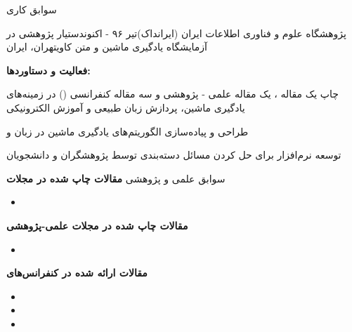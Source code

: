 \documentclass{resume} %
\begin{document}
%

\begin{rSection}{سوابق‌ کاری}
\def\jobtitle{دستیار پژوهشی در آزمایشگاه یادگیری ماشین و متن کاوی}
\def\employername{پژوهشگاه علوم و فناوری اطلاعات ایران (ایرانداک)}
\def\years{تیر ۹۶ - اکنون}
\def\location{تهران، ایران}

\begin{rSubsection}{\employername}{\years}{\jobtitle}{\location}

\textbf{فعالیت و دستاوردها:}
\item چاپ یک مقاله ، یک مقاله علمی - پژوهشی و سه مقاله کنفرانسی () در زمینه‌های یادگیری ماشین، پردازش زبان طبیعی و آموزش الکترونیکی
\item طراحی و پیاده‌سازی الگوریتم‌های یادگیری ماشین در زبان  و 
\item توسعه نرم‌افزار  برای حل کردن مسائل دسته‌بندی توسط پژوهشگران و دانشجویان

\end{rSubsection}

%
\end{rSection}
%
\begin{rSection}{سوابق علمی و پژوهشی}
\small\textbf{مقالات چاپ شده در مجلات }
\begin{latin}
\begin{itemize}
	\item {}
\end{itemize}
\end{latin}

\small\textbf{مقالات چاپ شده در مجلات علمی-پژوهشی}
{\footnotesize
\begin{itemize}
	\item {}
\end{itemize}
}

\small\textbf{مقالات ارائه شده در کنفرانس‌های }
{\footnotesize
\begin{itemize}
	\item {}
	\item {}
	\item {}
\end{itemize}
}
\end{rSection}
\end{document}
